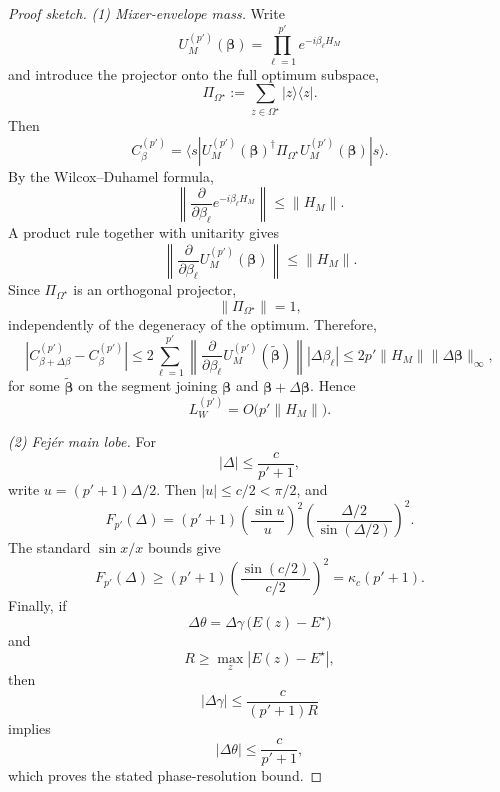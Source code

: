 \documentclass[10pt,a4paper]{amsart}
\begin{document}
\begin{proof}[Proof sketch]
\emph{(1) Mixer-envelope mass.}
Write
\[
U_M^{(p')}(\boldsymbol\beta)
=
\prod_{\ell=1}^{p'}
e^{-i\beta_\ell H_M}
\]
and introduce the projector onto the full optimum subspace,
\[
\Pi_{\Omega^\star}
:=
\sum_{z\in\Omega^\star}
|z\rangle\langle z|.
\]
Then
\[
C_{\beta}^{(p')}
=
\langle s|
U_M^{(p')}(\boldsymbol\beta)^\dagger
\Pi_{\Omega^\star}
U_M^{(p')}(\boldsymbol\beta)
|s\rangle.
\]
By the Wilcox--Duhamel formula,
\[
\left\|
\frac{\partial}{\partial\beta_\ell}
e^{-i\beta_\ell H_M}
\right\|
\le
\|H_M\|.
\]
A product rule together with unitarity gives
\[
\left\|
\frac{\partial}{\partial\beta_\ell}
U_M^{(p')}(\boldsymbol\beta)
\right\|
\le
\|H_M\|.
\]
Since \(\Pi_{\Omega^\star}\) is an orthogonal projector,
\[
\|\Pi_{\Omega^\star}\|=1,
\]
independently of the degeneracy of the optimum. Therefore,
\[
\left|
C_{\beta+\Delta\beta}^{(p')}
-
C_{\beta}^{(p')}
\right|
\le
2
\sum_{\ell=1}^{p'}
\left\|
\frac{\partial}{\partial\beta_\ell}
U_M^{(p')}(\widetilde{\boldsymbol\beta})
\right\|
|\Delta\beta_\ell|
\le
2p'\|H_M\|
\|\Delta\boldsymbol\beta\|_\infty,
\]
for some \(\widetilde{\boldsymbol\beta}\) on the segment joining
\(\boldsymbol\beta\) and
\(\boldsymbol\beta+\Delta\boldsymbol\beta\). Hence
\[
L_W^{(p')}
=
O\!\bigl(p'\|H_M\|\bigr).
\]

\smallskip
\emph{(2) Fej\'er main lobe.}
For
\[
|\Delta|
\le
\frac{c}{p'+1},
\]
write \(u=(p'+1)\Delta/2\). Then \(|u|\le c/2<\pi/2\), and
\[
F_{p'}(\Delta)
=
(p'+1)
\left(
\frac{\sin u}{u}
\right)^2
\left(
\frac{\Delta/2}{\sin(\Delta/2)}
\right)^2.
\]
The standard \(\sin x/x\) bounds give
\[
F_{p'}(\Delta)
\ge
(p'+1)
\left(
\frac{\sin(c/2)}{c/2}
\right)^2
=
\kappa_c(p'+1).
\]
Finally, if
\[
\Delta\theta
=
\Delta\gamma\,
\bigl(E(z)-E^\star\bigr)
\]
and
\[
R
\ge
\max_z|E(z)-E^\star|,
\]
then
\[
|\Delta\gamma|
\le
\frac{c}{(p'+1)R}
\]
implies
\[
|\Delta\theta|
\le
\frac{c}{p'+1},
\]
which proves the stated phase-resolution bound.
\end{proof}
\end{document}
